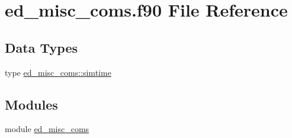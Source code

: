 \hypertarget{ed__misc__coms_8f90}{}\section{ed\+\_\+misc\+\_\+coms.\+f90 File Reference}
\label{ed__misc__coms_8f90}
\subsection*{Data Types}
\begin{DoxyCompactItemize}
\item 
type \hyperlink{structed__misc__coms_1_1simtime}{ed\+\_\+misc\+\_\+coms\+::simtime}
\end{DoxyCompactItemize}
\subsection*{Modules}
\begin{DoxyCompactItemize}
\item 
module \hyperlink{namespaceed__misc__coms}{ed\+\_\+misc\+\_\+coms}
\end{DoxyCompactItemize}

